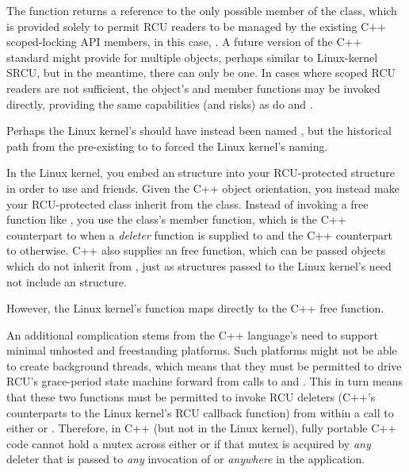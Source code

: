 The  function returns a reference to
the only possible member of the  class, which is provided
solely to permit RCU readers to be managed by the existing C++ scoped-locking
API members, in this case, .
A future version of the C++ standard might provide for multiple
 objects, perhaps similar to Linux-kernel SRCU, but in
the meantime, there can only be one.
In cases where scoped RCU readers are not sufficient, the 
object's  and  member functions may be
invoked directly, providing the same capabilities (and risks) as do
 and .

Perhaps the Linux kernel's  should have instead been
named , but the historical path from the pre-existing
 to  to 
forced the Linux kernel's naming.

In the Linux kernel, you embed an  structure into your
RCU-protected structure in order to use  and friends.
Given the C++ object orientation, you instead make your RCU-protected
class inherit from the  class.
Instead of invoking a free function like , you use the
 class's  member function, which is the C++
counterpart to  when a \emph{deleter} function is supplied
to  and the C++ counterpart to  otherwise.
C++ also supplies an  free function, which can be
passed objects which do not inherit from , just
as structures passed to the Linux kernel's 
need not include an  structure.

However, the Linux kernel's  function maps directly
to the C++  free function.

An additional complication stems from the C++ language's need to support
minimal unhosted and freestanding platforms.
Such platforms might not be able to create background threads, which
means that they must be permitted to drive RCU's grace-period state machine
forward from calls to  and .
This in turn means that these two functions must be permitted to
invoke RCU deleters (C++'s counterparts to the Linux kernel's RCU
callback function) from within a call to either  or
.
Therefore, in C++ (but not in the Linux kernel), fully portable C++ code
cannot hold a mutex across either  or  if
that mutex is acquired by \emph{any} deleter that is passed to \emph{any}
invocation of  or  \emph{anywhere} in
the application.

